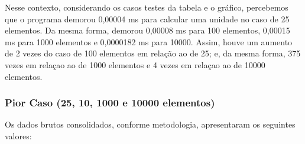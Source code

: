 \documentclass[a4paper, 12pt]{article}
\begin{document}
\vspace{0.8cm}
Nesse contexto, considerando os casos testes da tabela e o gráfico, percebemos que o programa demorou 0,00004 ms para calcular uma unidade no caso de 25 elementos. Da mesma forma, demorou 0,00008 ms para 100 elementos, 0,00015 ms para 1000 elementos e 0,0000182 ms para 10000. Assim, houve um aumento de 2 vezes do caso de 100 elementos em relação ao de 25; e, da mesma forma, 375 vezes em relaçao ao de 1000 elementos e 4 vezes em relaçao ao de 10000 elementos.


\subsubsection{Pior Caso (25, 10, 1000 e 10000 elementos)}

Os dados brutos consolidados, conforme metodologia, apresentaram os seguintes valores:
\vspace{0.2cm}
\end{document}
